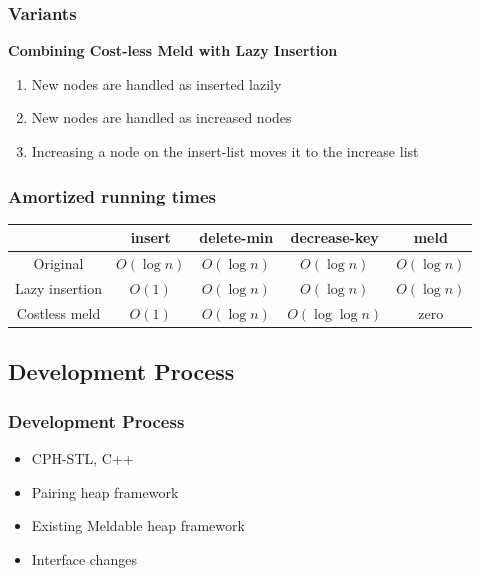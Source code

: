 \documentclass{beamer}
\begin{document}
\begin{frame}
\frametitle{Variants}

\textbf{Combining Cost-less Meld with Lazy Insertion}\\

\begin{enumerate}
\item New nodes are handled as inserted lazily
\item New nodes are handled as increased nodes
\item Increasing a node on the insert-list moves it to the increase list
\end{enumerate}

\end{frame}



\begin{frame}
\frametitle{Amortized running times}

\begin{tabular}{|c|c|c|c|c|}
\hline
& \textbf{insert} & \textbf{delete-min} & \textbf{decrease-key} & \textbf{meld} \\
\hline
Original & $O(\log n)$ & $O(\log n)$ & $O(\log n)$ & $O(\log n)$ \\
\hline
Lazy insertion & $O(1)$ & $O(\log n)$ & $O(\log n)$ & $O(\log n)$ \\
\hline
Costless meld & $O(1)$ & $O(\log n)$ & $O(\log \log n)$ & zero \\
\hline
\end{tabular}

\end{frame}


\begin{frame}
\subsection{Development Process}
\frametitle{Development Process}

\begin{itemize}
\item CPH-STL, C++
\item Pairing heap framework
\item Existing Meldable heap framework
\item Interface changes
\end{itemize}



\end{frame}
\end{document}
